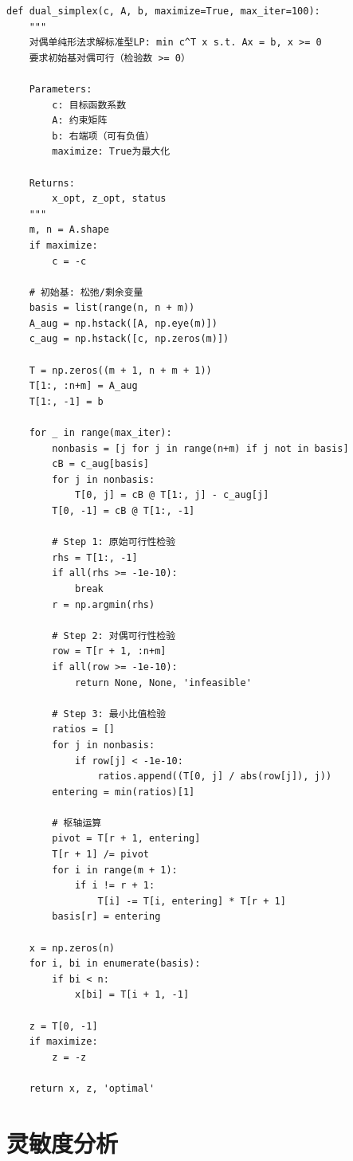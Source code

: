 \begin{codebox}[对偶单纯形法]
\begin{lstlisting}
def dual_simplex(c, A, b, maximize=True, max_iter=100):
    """
    对偶单纯形法求解标准型LP: min c^T x s.t. Ax = b, x >= 0
    要求初始基对偶可行（检验数 >= 0）
    
    Parameters:
        c: 目标函数系数
        A: 约束矩阵
        b: 右端项（可有负值）
        maximize: True为最大化
    
    Returns:
        x_opt, z_opt, status
    """
    m, n = A.shape
    if maximize:
        c = -c
    
    # 初始基: 松弛/剩余变量
    basis = list(range(n, n + m))
    A_aug = np.hstack([A, np.eye(m)])
    c_aug = np.hstack([c, np.zeros(m)])
    
    T = np.zeros((m + 1, n + m + 1))
    T[1:, :n+m] = A_aug
    T[1:, -1] = b
    
    for _ in range(max_iter):
        nonbasis = [j for j in range(n+m) if j not in basis]
        cB = c_aug[basis]
        for j in nonbasis:
            T[0, j] = cB @ T[1:, j] - c_aug[j]
        T[0, -1] = cB @ T[1:, -1]
        
        # Step 1: 原始可行性检验
        rhs = T[1:, -1]
        if all(rhs >= -1e-10):
            break
        r = np.argmin(rhs)
        
        # Step 2: 对偶可行性检验
        row = T[r + 1, :n+m]
        if all(row >= -1e-10):
            return None, None, 'infeasible'
        
        # Step 3: 最小比值检验
        ratios = []
        for j in nonbasis:
            if row[j] < -1e-10:
                ratios.append((T[0, j] / abs(row[j]), j))
        entering = min(ratios)[1]
        
        # 枢轴运算
        pivot = T[r + 1, entering]
        T[r + 1] /= pivot
        for i in range(m + 1):
            if i != r + 1:
                T[i] -= T[i, entering] * T[r + 1]
        basis[r] = entering
    
    x = np.zeros(n)
    for i, bi in enumerate(basis):
        if bi < n:
            x[bi] = T[i + 1, -1]
    
    z = T[0, -1]
    if maximize:
        z = -z
    
    return x, z, 'optimal'
\end{lstlisting}
\end{codebox}

\section{灵敏度分析}\label{sec:sensitivity}

